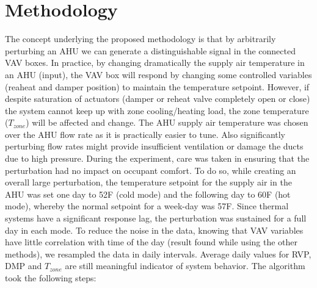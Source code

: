 \section{Methodology}

The concept underlying the proposed methodology is that by arbitrarily perturbing an AHU we can generate a distinguishable signal in the connected VAV boxes. In practice, by changing dramatically the supply air temperature in an AHU (input), the VAV box will respond by changing some controlled variables (reaheat and damper position) to maintain the temperature setpoint. However, if despite saturation of actuators (damper or reheat valve completely open or close) the system cannot keep up with zone cooling/heating load, the zone temperature ($T_{zone}$) will be affected and change. The AHU supply air temperature was chosen over the AHU flow rate as it is practically easier to tune. Also significantly perturbing flow rates might provide insufficient ventilation or damage the ducts due to high pressure. During the experiment, care was taken in ensuring that the perturbation had no impact on occupant comfort. To do so, while creating an overall large perturbation, the temperature setpoint for the supply air in the AHU was set one day to 52F (cold mode) and the following day to 60F (hot mode), whereby the normal setpoint for a week-day was 57F. Since thermal systems have a significant response lag, the perturbation was sustained for a full day in each mode. To reduce the noise in the data, knowing that VAV variables have little correlation with time of the day (result found while using the other methods), we resampled the data in daily intervals. Average daily values for RVP, DMP and $T_{zone}$ are still meaningful indicator of system behavior.
The algorithm took the following steps:

